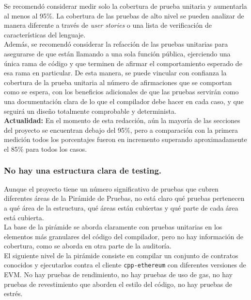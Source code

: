 Se recomendó considerar medir solo la cobertura de prueba unitaria y aumentarla al menos al 95\%. La cobertura de las pruebas de alto nivel se pueden analizar de manera diferente a través de \textit{user stories} o una lista de verificación de características del lenguaje.\\

Además, se recomendó considerar la refacción de las pruebas unitarias para asegurarse de que están llamando a una sola función pública, ejerciendo una única rama de código y que terminen de afirmar el comportamiento esperado de esa rama en particular. De esta manera, se puede vincular con confianza la cobertura de la prueba unitaria al número de afirmaciones que se comportan como se espera, con los beneficios adicionales de que las pruebas servirán como una documentación clara de lo que el compilador debe hacer en cada caso, y que seguirá un diseño totalmente comprobable y determinista.\\

\textbf{Actualidad:} En el momento de esta redacción, aún la mayoría de las secciones del proyecto se encuentran debajo del 95\%, pero a comparación con la primera medición todos los porcentajes fueron en incremento superando aproximadamente el 85\%\cite{CodeCovEthereumSolidityCurrent} para todos los casos.\\


\subsubsection{No hay una estructura clara de testing.}
Aunque el proyecto tiene un número significativo de pruebas que cubren diferentes áreas de la Pirámide de Pruebas, no está claro qué pruebas pertenecen a qué área de la estructura, qué áreas están cubiertas y qué parte de cada área está cubierta.\\

La base de la pirámide se aborda claramente con pruebas unitarias en los elementos más granulares del código del compilador, pero no hay información de cobertura, como se aborda en otra parte de la auditoría.\\

El siguiente nivel de la pirámide consiste en compilar un conjunto de contratos conocidos y ejecutarlos contra el cliente \verb|cpp-ethereum| con diferentes versiones de EVM.
No hay pruebas de rendimiento, no hay pruebas de uso de gas, no hay pruebas de revestimiento que aborden el estilo del código, no hay pruebas de estrés.\\

